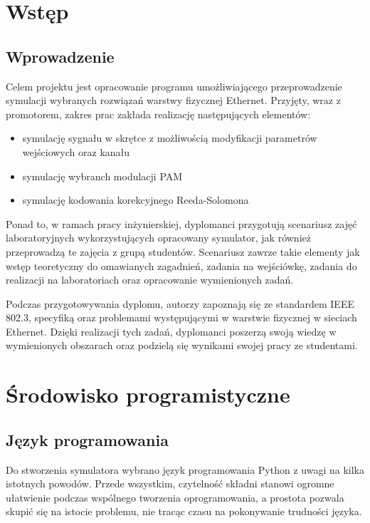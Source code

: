 \section{Wstęp}
\subsection{Wprowadzenie}

Celem projektu jest opracowanie programu umożliwiającego przeprowadzenie symulacji wybranych rozwiązań warstwy fizycznej Ethernet.
Przyjęty, wraz z promotorem, zakres prac zakłada realizację następujących elementów:
\begin{itemize}
    \item symulację sygnału w skrętce z możliwością modyfikacji parametrów wejściowych oraz kanału
    \item symulację wybranch modulacji PAM
    \item symulację kodowania korekcyjnego Reeda-Solomona
\end{itemize}

Ponad to, w ramach pracy inżynierskiej, dyplomanci przygotują scenariusz zajęć laboratoryjnych wykorzystujących opracowany symulator, jak
również przeprowadzą te zajęcia z grupą studentów. Scenariusz zawrze takie elementy jak wstęp teoretyczny do omawianych zagadnień,
zadania na wejściówkę, zadania do realizacji na laboratoriach oraz opracowanie wymienionych zadań.

Podczas przygotowywania dyplomu, autorzy zapoznają się ze standardem IEEE 802.3, specyfiką oraz problemami występującymi w warstwie fizycznej
w sieciach Ethernet. Dzięki realizacji tych zadań, dyplomanci poszerzą swoją wiedzę w wymienionych obszarach oraz podzielą się wynikami
swojej pracy ze studentami.

\section{Środowisko programistyczne}
\subsection{Język programowania}

Do stworzenia symulatora wybrano język programowania Python z uwagi na kilka istotnych powodów. Przede wszystkim, czytelność składni stanowi ogromne ułatwienie podczas wspólnego tworzenia oprogramowania, a prostota pozwala skupić się na istocie problemu, nie tracąc czasu na pokonywanie trudności języka.

